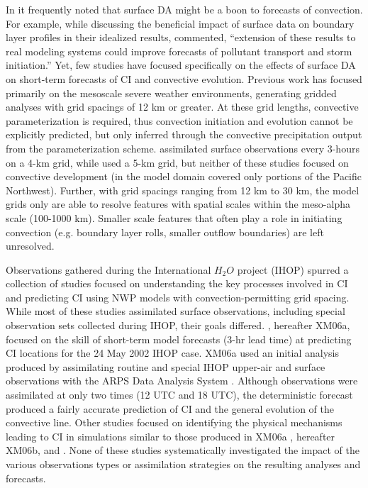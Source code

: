 In it frequently noted that surface DA might be a boon to forecasts of convection. For example, while discussing the beneficial impact of surface data on boundary layer profiles in their idealized results, \citet{hackersnyder05} commented, “extension of these results to real modeling systems could improve forecasts of pollutant transport and storm initiation.” Yet, few studies have focused specifically on the effects of surface DA on short-term forecasts of CI and convective evolution. Previous work has focused primarily on the mesoscale severe weather environments, generating gridded analyses with grid spacings of 12 km or greater. At these grid lengths, convective parameterization is required, thus convection initiation and evolution cannot be explicitly predicted, but only inferred through the convective precipitation output from the parameterization scheme. \citet{ancell12} assimilated surface observations every 3-hours on a 4-km grid, while \citet{knopfmeierstensrud13} used a 5-km grid, but neither of these studies focused on convective development (in \citealt{ancell12} the model domain covered only portions of the Pacific Northwest). Further, with grid spacings ranging from 12 km to 30 km, the model grids only are able to resolve features with spatial scales within the meso-alpha scale (100-1000 km). Smaller scale features that often play a role in initiating convection (e.g. boundary layer rolls, smaller outflow boundaries) are left unresolved.

Observations gathered during the International \(H_2O\) project (IHOP) spurred a collection of studies focused on understanding the key processes involved in CI and predicting CI using NWP models with convection-permitting grid spacing. While most of these studies assimilated surface observations, including special observation sets collected during IHOP, their goals differed. \citet{xuemartin06a}, hereafter XM06a, focused on the skill of short-term model forecasts (3-hr lead time) at predicting CI locations for the 24 May 2002 IHOP case. XM06a used an initial analysis produced by assimilating routine and special IHOP upper-air and surface observations with the ARPS Data Analysis System \citep{brewster96}. Although observations were assimilated at only two times (12 UTC and 18 UTC), the deterministic forecast produced a fairly accurate prediction of CI and the general evolution of the convective line. Other studies focused on identifying the physical mechanisms leading to CI in simulations similar to those produced in XM06a \citep{xuemartin06b}, hereafter XM06b, and \citet{wangxue12}. None of these studies systematically investigated the impact of the various observations types or assimilation strategies on the resulting analyses and forecasts. 

